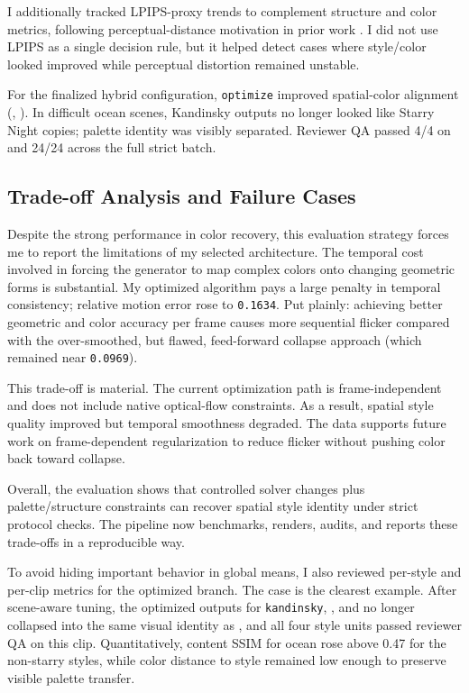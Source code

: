 \documentclass[12pt,letterpaper]{article}
\begin{document}
I additionally tracked LPIPS-proxy trends to complement structure and color metrics, following perceptual-distance motivation in prior work \cite{zhang2018}. I did not use LPIPS as a single decision rule, but it helped detect cases where style/color looked improved while perceptual distortion remained unstable.

For the finalized hybrid configuration, \texttt{optimize} improved spatial-color alignment (, ). In difficult ocean scenes, Kandinsky outputs no longer looked like Starry Night copies; palette identity was visibly separated. Reviewer QA passed 4/4 on  and 24/24 across the full strict batch.

\subsection{Trade-off Analysis and Failure Cases}

Despite the strong performance in color recovery, this evaluation strategy forces me to report the limitations of my selected architecture. The temporal cost involved in forcing the generator to map complex colors onto changing geometric forms is substantial. My optimized algorithm pays a large penalty in temporal consistency; relative motion error rose to \texttt{0.1634}. Put plainly: achieving better geometric and color accuracy per frame causes more sequential flicker compared with the over-smoothed, but flawed, feed-forward collapse approach (which remained near \texttt{0.0969}).

This trade-off is material. The current optimization path is frame-independent and does not include native optical-flow constraints. As a result, spatial style quality improved but temporal smoothness degraded. The data supports future work on frame-dependent regularization to reduce flicker without pushing color back toward collapse.

Overall, the evaluation shows that controlled solver changes plus palette/structure constraints can recover spatial style identity under strict protocol checks. The pipeline now benchmarks, renders, audits, and reports these trade-offs in a reproducible way.

To avoid hiding important behavior in global means, I also reviewed per-style and per-clip metrics for the optimized branch. The  case is the clearest example. After scene-aware tuning, the optimized outputs for \texttt{kandinsky}, , and  no longer collapsed into the same visual identity as , and all four style units passed reviewer QA on this clip. Quantitatively, content SSIM for ocean rose above 0.47 for the non-starry styles, while color distance to style remained low enough to preserve visible palette transfer.
\end{document}
